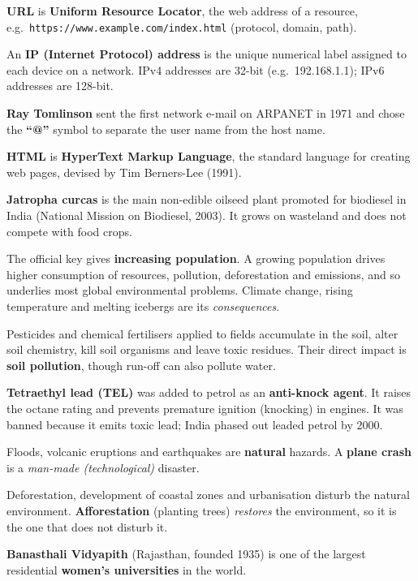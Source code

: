 \textbf{URL} is \textbf{Uniform Resource Locator}, the web address of a resource, e.g.\ \texttt{https://www.example.com/index.html} (protocol, domain, path).

An \textbf{IP (Internet Protocol) address} is the unique numerical label assigned to each device on a network. IPv4 addresses are 32-bit (e.g.\ 192.168.1.1); IPv6 addresses are 128-bit.

\textbf{Ray Tomlinson} sent the first network e-mail on ARPANET in 1971 and chose the \textbf{``@''} symbol to separate the user name from the host name.

\textbf{HTML} is \textbf{HyperText Markup Language}, the standard language for creating web pages, devised by Tim Berners-Lee (1991).

\textbf{Jatropha curcas} is the main non-edible oilseed plant promoted for biodiesel in India (National Mission on Biodiesel, 2003). It grows on wasteland and does not compete with food crops.

The official key gives \textbf{increasing population}. A growing population drives higher consumption of resources, pollution, deforestation and emissions, and so underlies most global environmental problems. Climate change, rising temperature and melting icebergs are its \emph{consequences}.

Pesticides and chemical fertilisers applied to fields accumulate in the soil, alter soil chemistry, kill soil organisms and leave toxic residues. Their direct impact is \textbf{soil pollution}, though run-off can also pollute water.

\textbf{Tetraethyl lead (TEL)} was added to petrol as an \textbf{anti-knock agent}. It raises the octane rating and prevents premature ignition (knocking) in engines. It was banned because it emits toxic lead; India phased out leaded petrol by 2000.

Floods, volcanic eruptions and earthquakes are \textbf{natural} hazards. A \textbf{plane crash} is a \emph{man-made (technological)} disaster.

Deforestation, development of coastal zones and urbanisation disturb the natural environment. \textbf{Afforestation} (planting trees) \emph{restores} the environment, so it is the one that does not disturb it.

\textbf{Banasthali Vidyapith} (Rajasthan, founded 1935) is one of the largest residential \textbf{women's universities} in the world.


